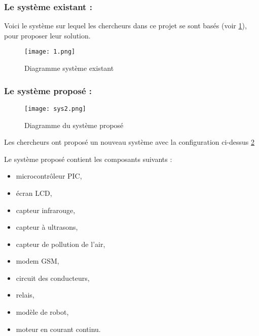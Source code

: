 \documentclass[a4paper,12pt]{report}
\begin{document}
\subsubsection*{Le système existant :}
Voici le système sur lequel les chercheurs dans ce projet se sont basés (voir \ref{syst existant}), pour proposer leur solution.
\begin {figure}[H]
\begin{center} \texttt{[image: 1.png]}
\caption{Diagramme système existant \cite{ref19}}
\label{syst existant}
\end{center}
\end{figure}
\subsubsection*{Le système proposé :}

\begin {figure}[H]
\begin{center} \texttt{[image: sys2.png]}
\caption{Diagramme du système proposé \cite{ref19}}
\label{fig2}
\end{center}
\end{figure}
Les chercheurs ont proposé un nouveau système avec la configuration ci-dessus \ref{fig2} 

Le système proposé contient les composants suivants \cite{ref19} :
\begin{itemize}
\item microcontrôleur PIC,
\item écran LCD,
\item capteur infrarouge,
\item capteur à ultrasons,
\item capteur de pollution de l'air,
\item modem GSM,
\item circuit des conducteurs,
\item relais,
\item modèle de robot,
\item moteur en courant continu.\\
\end{itemize}
\end{document}

